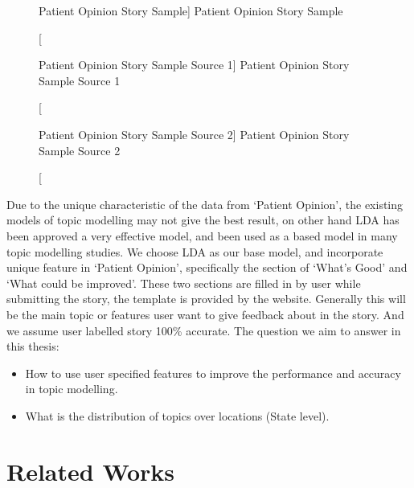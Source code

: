 \documentclass[11pt,twoside]{report}
\begin{document}
\begin{figure}[tp]
    \begin{center}
    \caption
    [Patient Opinion Story Sample]
    {
    Patient Opinion Story Sample
    \label{Figure1}
    }
    \end{center}
\end{figure}

\begin{figure}[h]
    \begin{center}
    \caption
    [Patient Opinion Story Sample Source 1]
    {
    Patient Opinion Story Sample Source 1
    \label{Figure2}
    }
    \end{center}
\end{figure}

\begin{figure}[h]
    \begin{center}
    \caption
    [Patient Opinion Story Sample Source 2]
    {
    Patient Opinion Story Sample Source 2
    \label{Figure3}
    }
    \end{center}
\end{figure}

Due to the unique characteristic of the data from ‘Patient Opinion’, the existing models of topic modelling may not give the best result, on other hand LDA has been approved a very effective  model, and been used as a based model in many topic modelling studies. We choose LDA as our base model, and incorporate unique feature in ‘Patient Opinion’, specifically the section of ‘What’s Good’ and ‘What could be improved’. These two sections are filled in by user while submitting the story, the template is provided by the website. Generally this will be the main topic or features user want to give feedback about in the story. And we assume user labelled story 100\% accurate. The question we aim to answer in this thesis:
\begin{itemize}
\item How to use user specified features to improve the performance and accuracy in topic modelling.
\item What is the distribution of topics over locations (State level).
\end{itemize}

\chapter{Related Works}
\end{document}
